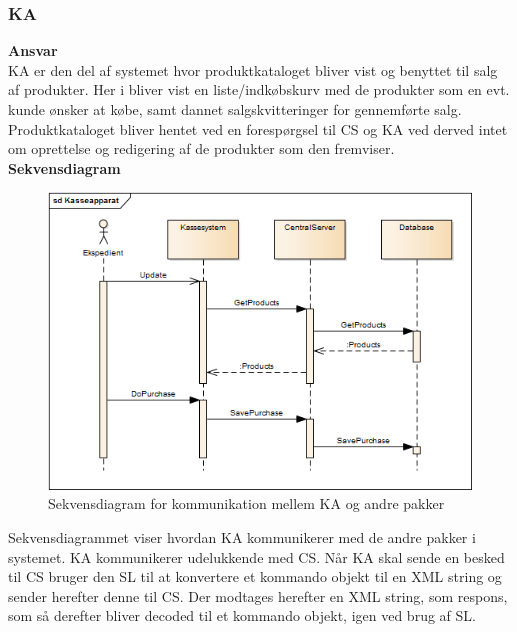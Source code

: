 \subsubsection{\gls{KA}}

\textbf{Ansvar} \\
\gls{KA} er den del af systemet hvor produktkataloget bliver vist og benyttet til salg af produkter. Her i bliver vist en liste/indkøbskurv med de produkter som en evt. kunde ønsker at købe, samt dannet salgskvitteringer for gennemførte salg. Produktkataloget bliver hentet ved en forespørgsel til \gls{CS} og \gls{KA} ved derved intet om oprettelse og redigering af de produkter som den fremviser. \\

\textbf{Sekvensdiagram}
\begin{figure}[H]
	\centering
	\includegraphics[width=\textwidth]{Systemarkitektur/LogiskView/Kasseapparat-sekvensdiagram}
	\caption{Sekvensdiagram for kommunikation mellem \gls{KA} og andre pakker}
	\label{fig:logview_kasse_sekvensdiagram}
\end{figure}

Sekvensdiagrammet viser hvordan \gls{KA} kommunikerer med de andre pakker i systemet. \gls{KA} kommunikerer udelukkende med \gls{CS}. Når \gls{KA} skal sende en besked til \gls{CS} bruger den \gls{SL} til at konvertere et kommando objekt til en XML string og sender herefter denne til \gls{CS}. Der modtages herefter en XML string, som respons, som så derefter bliver decoded til et kommando objekt, igen ved brug af \gls{SL}.

\newpage

